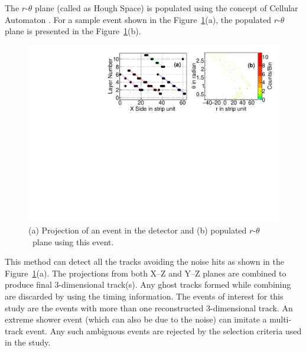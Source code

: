 \documentclass[a4paper,12pt,twoside,openany]{article}
\begin{document}
The \mbox{$r$-$\theta$} plane (called as Hough Space) is populated
using the concept of Cellular Automaton \cite{cellular}. For a sample
event shown in the Figure~\ref{fig:houghPl}(a), the populated
\mbox{$r$-$\theta$} plane is presented in the
Figure~\ref{fig:houghPl}(b). 
\begin{figure}
  \centering
  \includegraphics[width=0.99\linewidth]{hough_Plane_new.pdf} 
  \caption{(a) Projection of an event in the detector and
    (b) populated $r$-$\theta$~plane using this event.}
  \label{fig:houghPl}
\end{figure}
This method can detect all the tracks avoiding the noise hits as shown
in the Figure~\ref{fig:houghPl}(a). The projections from both X--Z and
Y--Z planes are combined to produce final 3-dimensional track(s). Any
ghost tracks formed while combining are discarded by using the timing
information. The events of interest for this study are the events with
more than one reconstructed 3-dimensional track. An extreme shower
event (which can also be due to the noise) can imitate a multi-track
event. Any such ambiguous events are rejected by the selection
criteria used in the study.
\end{document}
